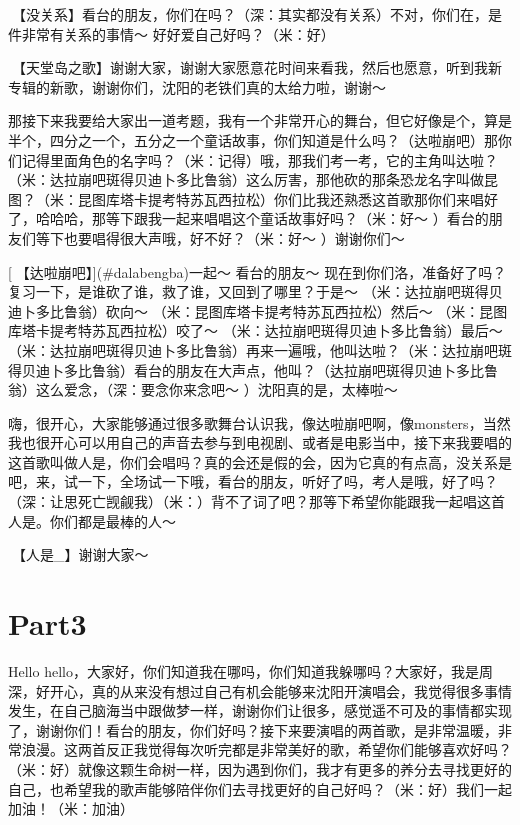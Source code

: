\documentclass[
]{book}
\begin{document}
🎵【没关系】看台的朋友，你们在吗？（深：其实都没有关系）不对，你们在，是件非常有关系的事情～ 好好爱自己好吗？（米：好）

🎵【天堂岛之歌】谢谢大家，谢谢大家愿意花时间来看我，然后也愿意，听到我新专辑的新歌，谢谢你们，沈阳的老铁们真的太给力啦，谢谢～

那接下来我要给大家出一道考题，我有一个非常开心的舞台，但它好像是个，算是半个，四分之一个，五分之一个童话故事，你们知道是什么吗？（达啦崩吧）那你们记得里面角色的名字吗？（米：记得）哦，那我们考一考，它的主角叫达啦？（米：达拉崩吧斑得贝迪卜多比鲁翁）这么厉害，那他砍的那条恐龙名字叫做昆图？（米：昆图库塔卡提考特苏瓦西拉松）你们比我还熟悉这首歌那你们来唱好了，哈哈哈，那等下跟我一起来唱唱这个童话故事好吗？（米：好～ ）看台的朋友们等下也要唱得很大声哦，好不好？（米：好～ ）谢谢你们～

[🎵【达啦崩吧】](#dalabengba)一起～ 看台的朋友～ 现在到你们洛，准备好了吗？复习一下，是谁砍了谁，救了谁，又回到了哪里？于是～ （米：达拉崩吧斑得贝迪卜多比鲁翁）砍向～ （米：昆图库塔卡提考特苏瓦西拉松）然后～ （米：昆图库塔卡提考特苏瓦西拉松）咬了～ （米：达拉崩吧斑得贝迪卜多比鲁翁）最后～ （米：达拉崩吧斑得贝迪卜多比鲁翁）再来一遍哦，他叫达啦？（米：达拉崩吧斑得贝迪卜多比鲁翁）看台的朋友在大声点，他叫？（达拉崩吧斑得贝迪卜多比鲁翁）这么爱念，（深：要念你来念吧～ ）沈阳真的是，太棒啦～

嗨，很开心，大家能够通过很多歌舞台认识我，像达啦崩吧啊，像monsters，当然我也很开心可以用自己的声音去参与到电视剧、或者是电影当中，接下来我要唱的这首歌叫做人是，你们会唱吗？真的会还是假的会，因为它真的有点高，没关系是吧，来，试一下，全场试一下哦，看台的朋友，听好了吗，考人是哦，好了吗？（深：让思死亡觊觎我）（米：）背不了词了吧？那等下希望你能跟我一起唱这首人是。你们都是最棒的人～

🎵【人是\_】谢谢大家～

\section{Part3}\label{shenyang-20240907-part3}

Hello hello，大家好，你们知道我在哪吗，你们知道我躲哪吗？大家好，我是周深，好开心，真的从来没有想过自己有机会能够来沈阳开演唱会，我觉得很多事情发生，在自己脑海当中跟做梦一样，谢谢你们让很多，感觉遥不可及的事情都实现了，谢谢你们！看台的朋友，你们好吗？接下来要演唱的两首歌，是非常温暖，非常浪漫。这两首反正我觉得每次听完都是非常美好的歌，希望你们能够喜欢好吗？（米：好）就像这颗生命树一样，因为遇到你们，我才有更多的养分去寻找更好的自己，也希望我的歌声能够陪伴你们去寻找更好的自己好吗？（米：好）我们一起加油！（米：加油）
\end{document}
